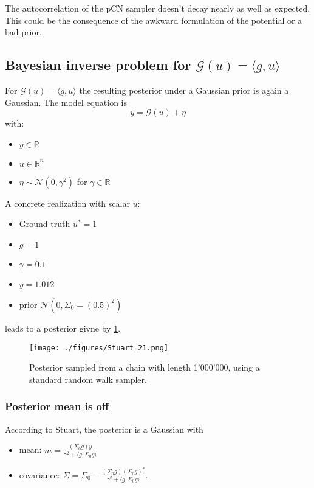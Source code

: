 \documentclass[11pt]{article}
\newcommand{\R}{{\mathbb{R}}}
\newcommand{\G}[1]{{\mathcal{G} \left( #1 \right)}}
\newcommand{\N}[2]{\mathcal{N}\left(#1,#2\right)}
\begin{document}
The autocorrelation of the pCN sampler doesn't decay nearly as well as expected.
This could be the consequence of the awkward formulation of the potential or a bad prior.

\subsection{Bayesian inverse problem for \(\G{u} = \langle g,u \rangle\)}
\label{sec:org6245881}
For \(\G{u} = \langle g,u \rangle\) the resulting posterior under a Gaussian prior
is again a Gaussian. The model equation is
$$y = \G{u} + \eta$$
with:
\begin{itemize}
\item \(y \in \R\)
\item \(u \in \R^n\)
\item \(\eta \sim \N{0}{\gamma^2}\) for \(\gamma \in \R\)
\end{itemize}

A concrete realization with scalar \(u\):
\begin{itemize}
\item Ground truth \(u^* = 1\)
\item \(g = 1\)
\item \(\gamma = 0.1\)
\item \(y = 1.012\)
\item prior \(\N{0}{\Sigma_0=(0.5)^2}\)
\end{itemize}
leads to a posterior givne by \ref{fig:stuart_21_density}.

\begin{figure}[htbp]
\centering
\texttt{[image: ./figures/Stuart\_21.png]}
\caption{\label{fig:stuart_21_density}
Posterior sampled from a chain with length 1'000'000, using a standard random walk sampler.}
\end{figure}

\subsubsection{Posterior mean is off}
\label{sec:org56b1f1e}

According to Stuart, the posterior is a Gaussian with

\begin{itemize}
\item mean: \(m = \frac{(\Sigma_0 g) y}{\gamma^2 + \langle g, \Sigma_0g \rangle}\)
\item covariance: \(\Sigma = \Sigma_0 - \frac{(\Sigma_0 g)(\Sigma_0 g)^*}{\gamma^2 + \langle g, \Sigma_0g \rangle}\).
\end{itemize}
\end{document}
